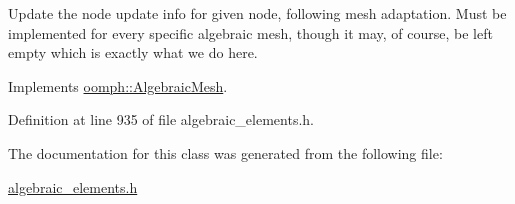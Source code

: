 Update the node update info for given node, following mesh adaptation. Must be implemented for every specific algebraic mesh, though it may, of course, be left empty which is exactly what we do here. 



Implements \hyperlink{classoomph_1_1AlgebraicMesh_a6c6a35ae2be6e2766f5b80d85693c1ce}{oomph\+::\+Algebraic\+Mesh}.



Definition at line 935 of file algebraic\+\_\+elements.\+h.



The documentation for this class was generated from the following file\+:\begin{DoxyCompactItemize}
\item 
\hyperlink{algebraic__elements_8h}{algebraic\+\_\+elements.\+h}\end{DoxyCompactItemize}
